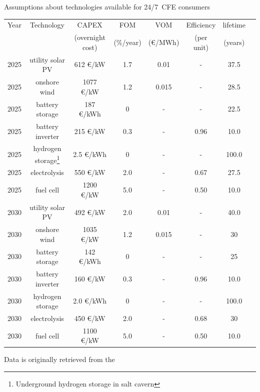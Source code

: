 \begin{frame}{Assumptions about technologies available for 24/7~CFE consumers}
  
  \centering
  {\footnotesize 

    \begin{tabular}{cccccccc}
      \hline
      \hline
      Year & Technology & CAPEX & FOM & VOM & Efficiency & lifetime \\
       &  & (overnight cost)  &  (\%/year) &  (€/MWh) & (per unit) & (years) \\
      \hline
      \hline
      2025 & utility solar PV & 612 €/kW & 1.7 & 0.01 & - & 37.5 \\
      \hline
      2025 & onshore wind & 1077 €/kW & 1.2 & 0.015 & - & 28.5 \\
      \hline
      2025 & battery storage & 187 €/kWh & 0 & - & - & 22.5 \\
      \hline
      2025  & battery inverter & 215 €/kW & 0.3 & - & 0.96  & 10.0 \\
      \hline
      2025 & hydrogen storage\footnote{{\scriptsize Underground hydrogen storage in salt cavern}} 
                  & 2.5 €/kWh & 0 & - & - & 100.0 \\
      \hline
      2025 & electrolysis & 550 €/kW & 2.0 & - & 0.67 & 27.5  \\
      \hline
      2025 & fuel cell & 1200 €/kW & 5.0 & - & 0.50 & 10.0 \\
      \hline
      \hline
      2030 & utility solar PV & 492 €/kW & 2.0 & 0.01 & - & 40.0 \\
      \hline
      2030 & onshore wind & 1035 €/kW & 1.2 & 0.015 & - & 30 \\
      \hline
      2030 & battery storage & 142 €/kWh & 0 & - & - & 25 \\
      \hline
      2030  & battery inverter & 160 €/kW & 0.3 & - & 0.96  & 10.0 \\
      \hline
      2030 & hydrogen storage  & 2.0 €/kWh & 0 & - & - & 100.0 \\
      \hline
      2030 & electrolysis & 450 €/kW & 2.0 & - & 0.68 & 30  \\
      \hline
      2030 & fuel cell & 1100 €/kW & 5.0 & - & 0.50 & 10.0 \\
      \hline
      \hline
      \end{tabular}
  
    Data is originally retrieved from the 
      \vspace{0.2cm}
  }
\end{frame}

